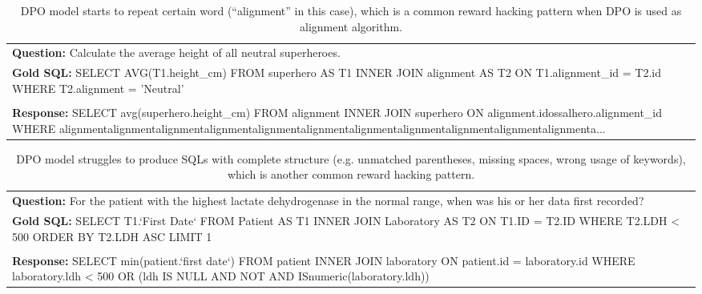 \begin{table*}[htbp]
\centering
\begin{tcolorbox}[
    colback=white, %
    colframe=black, %
    title=Reward Hacking Example, %
    fonttitle=\bfseries, %
    width=\textwidth, %
    boxrule=1pt, %
    rounded corners, %
]

\begin{tabularx}{\textwidth}{X}
\textbf{Question:} Calculate the average height of all neutral superheroes.\\ 
\textbf{Gold SQL:} SELECT AVG(T1.height\_cm) FROM superhero AS T1 INNER JOIN alignment AS T2 ON T1.alignment\_id = T2.id WHERE T2.alignment = 'Neutral' \\
\hline
\\ \textbf{Response:} SELECT avg(superhero.height\_cm) FROM alignment INNER JOIN superhero ON alignment.idossalhero.alignment\_id WHERE {\color{red}alignmentalignmentalignmentalignmentalignmentalignmentalignmentalignmentalignmentalignmentalignmenta}...
\end{tabularx}
\end{tcolorbox}
\caption{DPO model starts to repeat certain word (``alignment'' in this case), which is a common reward hacking pattern when DPO is used as alignment algorithm.}
\label{tab:egRH2}
\end{table*}

\begin{table*}[htbp]
\centering
\begin{tcolorbox}[
    colback=white, %
    colframe=black, %
    title=Reward Hacking Example, %
    fonttitle=\bfseries, %
    width=\textwidth, %
    boxrule=1pt, %
    rounded corners, %
]

\begin{tabularx}{\textwidth}{X}
\textbf{Question:} For the patient with the highest lactate dehydrogenase in the normal range, when was his or her data first recorded? \\ 
\textbf{Gold SQL:} SELECT T1.`First Date` FROM Patient AS T1 INNER JOIN Laboratory AS T2 ON T1.ID = T2.ID WHERE T2.LDH < 500 ORDER BY T2.LDH ASC LIMIT 1 \\
\hline
\\ \textbf{Response:} SELECT min(patient.`first date`) FROM patient INNER JOIN laboratory ON patient.id = laboratory.id WHERE laboratory.ldh < 500 OR {\color{red} (ldh IS NULL AND NOT AND ISnumeric(laboratory.ldh))}
\end{tabularx}
\end{tcolorbox}
\caption{DPO model struggles to produce SQLs with complete structure (e.g. unmatched parentheses, missing spaces, wrong usage of keywords), which is another common reward hacking pattern.}
\label{tab:egRH3}
\end{table*}